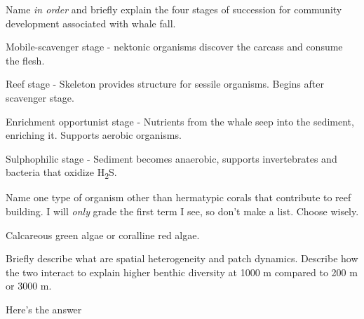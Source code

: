 \documentclass[11pt, addpoints]{exam}
\newcommand*\AnswerBox[2]{%
    \parbox[t][#1]{0.92\textwidth}{%
    \begin{solution}#2\end{solution}}
    \vspace{\stretch{1}}
}
\newenvironment{AnswerPage}[1]
    {\begin{minipage}[t][#1]{0.92\textwidth}%
    \begin{solution}}
    {\end{solution}\end{minipage}
    \vspace{\stretch{1}}}
\begin{document}
\begin{questions}
%

\question[10]
Name \emph{in order} and briefly explain the four stages of succession for community development associated with whale fall. %

\begin{AnswerPage}{0.3\textheight}%

Mobile-scavenger stage - nektonic organisms discover the carcass and consume the flesh. \bigskip

Reef stage - Skeleton provides structure for sessile organisms. Begins after scavenger stage. \bigskip

Enrichment opportunist stage - Nutrients from the whale seep into the sediment, enriching it. Supports aerobic organisms. \bigskip

Sulphophilic stage - Sediment becomes anaerobic, supports invertebrates and bacteria that oxidize H\textsubscript{2}S.


\end{AnswerPage}

\question[2]
Name one type of organism other than hermatypic corals that contribute to reef building. I will \emph{only} grade the first term I see, so don't make a list. Choose wisely.

\AnswerBox{-2\baselineskip}{%
Calcareous green algae or coralline red algae.}

\newpage

\question[10] 
Briefly describe what are spatial heterogeneity and patch dynamics. Describe how the two interact to explain higher benthic diversity at 1000 m compared to 200 m or 3000 m. %

\begin{AnswerPage}{3in}%

Here's the answer

\end{AnswerPage}


\end{questions}
\end{document}
